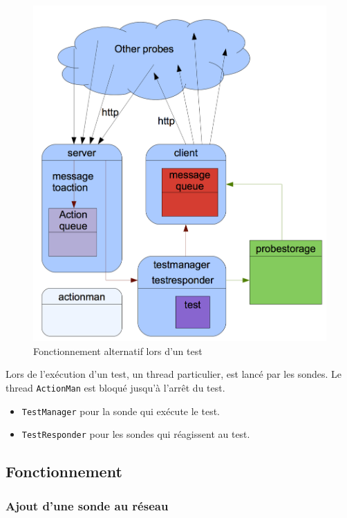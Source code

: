 \documentclass[a4paper,11pt]{article}
\newcommand{\cd}[1]{\texttt{#1}}
\begin{document}
\begin{figure}[!ht]
\centering\includegraphics[width=\linewidth]{img/graphTest.png}
\caption{Fonctionnement alternatif lors d'un test}
\end{figure}

Lors de l'exécution d'un test, un thread particulier, est lancé par les sondes. Le thread \cd{ActionMan} est bloqué jusqu'à l'arrêt du test.
\begin{itemize}
\item \cd{TestManager} pour la sonde qui exécute le test.
\item \cd{TestResponder} pour les sondes qui réagissent au test.
\end{itemize}

\subsection{Fonctionnement}

\subsubsection{Ajout d'une sonde au réseau}
\end{document}
